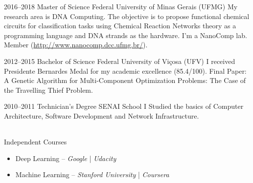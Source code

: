 \documentclass[a4paper]{cv-friggeri-x}
\begin{document}
\begin{entrylist}



\entry
    {2016--2018}
    {Master {\normalfont of Science}}
    {Federal University of Minas Gerais (UFMG)}
    {My research area is DNA Computing. The objective is to propose functional chemical circuits for classification tasks using Chemical Reaction Networks theory as a programming language and DNA strands as the hardware. I'm a NanoComp lab. Member (\href{http://www.nanocomp.dcc.ufmg.br/}{http://www.nanocomp.dcc.ufmg.br/}).}

\entry
    {2012--2015}
    {Bachelor {\normalfont of Science}}
    {Federal University of Vi\c cosa (UFV)}
    {I received Presidente Bernardes Medal for my academic excellence (85.4/100). Final Paper: A Genetic Algorithm for Multi-Component Optimization Problems: The Case of the Travelling Thief Problem.}


\entry
    {2010--2011}
    {Technician's {\normalfont Degree}}
    {SENAI School}
    {I Studied the basics of Computer Architecture, Software Development and Network Infrastructure.}

\entry
    {}
    {\\Independent {\normalfont Courses}}
    {}
    {\begin{itemize}%
        \item Deep Learning -- \textit{Google} | \textit{Udacity}%
        \item Machine Learning -- \textit{Stanford University} | \textit{Coursera}%
    \end{itemize}}


\end{entrylist}

\end{document}
